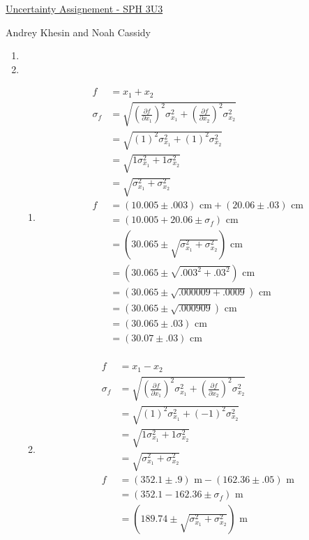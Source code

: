 \documentclass{article}
\begin{document}
\centerline{\sc \large \underline{Uncertainty Assignement - SPH 3U3}}
\centerline{\sc Andrey Khesin and Noah Cassidy}
\centerline{}

\begin{enumerate}
\item 
\item
\begin{enumerate}
\item
\begin{align*}
f &= x_{1} + x_{2}\\
\sigma_{f} &= \sqrt{(\frac{\partial f}{\partial x_{1}})^2\sigma_{x_{1}}^2 + (\frac{\partial f}{\partial x_{2}})^2\sigma_{x_{2}}^2}\\
&= \sqrt{(1)^2\sigma_{x_{1}}^2 + (1)^2\sigma_{x_{2}}^2}\\
&= \sqrt{1\sigma_{x_{1}}^2 + 1\sigma_{x_{2}}^2}\\
&= \sqrt{\sigma_{x_{1}}^2 + \sigma_{x_{2}}^2}\\
f &= (10.005 \pm .003)\text{ cm} + (20.06 \pm .03)\text{ cm}\\
&= (10.005 + 20.06 \pm \sigma_{f})\text{ cm}\\
&= (30.065 \pm \sqrt{\sigma_{x_{1}}^2 + \sigma_{x_{2}}^2})\text{ cm}\\
&= (30.065 \pm \sqrt{.003^2 + .03^2})\text{ cm}\\
&= (30.065 \pm \sqrt{.000009 + .0009})\text{ cm}\\
&= (30.065 \pm \sqrt{.000909})\text{ cm}\\
&= (30.065 \pm .03)\text{ cm}\\
&= (30.07 \pm .03)\text{ cm}\\
\end{align*}
\item
\begin{align*}
f &= x_{1} - x_{2}\\
\sigma_{f} &= \sqrt{(\frac{\partial f}{\partial x_{1}})^2\sigma_{x_{1}}^2 + (\frac{\partial f}{\partial x_{2}})^2\sigma_{x_{2}}^2}\\
&= \sqrt{(1)^2\sigma_{x_{1}}^2 + (-1)^2\sigma_{x_{2}}^2}\\
&= \sqrt{1\sigma_{x_{1}}^2 + 1\sigma_{x_{2}}^2}\\
&= \sqrt{\sigma_{x_{1}}^2 + \sigma_{x_{2}}^2}\\
f &= (352.1 \pm .9)\text{ m} - (162.36 \pm .05)\text{ m}\\
&= (352.1 - 162.36 \pm \sigma_{f})\text{ m}\\
&= (189.74 \pm \sqrt{\sigma_{x_{1}}^2 + \sigma_{x_{2}}^2})\text{ m}\\

\end{align*}
\end{enumerate}
\end{enumerate}
\end{document}
